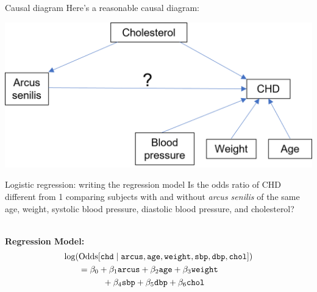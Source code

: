 \documentclass[10pt,t]{beamer}
\newcommand\tab[1][1cm]{\hspace*{#1}}
\begin{document}
\begin{frame}{Causal diagram}
	Here's a reasonable causal diagram:
	\begin{center}
		\includegraphics[width=\textwidth]{./figs/DAG}
		\end{center}
	
\end{frame}

\begin{frame}{Logistic regression: writing the regression model}
	Is the odds ratio of CHD different from 1 comparing subjects with and without \textit{arcus senilis} of the same age, weight, systolic blood pressure, diastolic blood pressure, and cholesterol? 
	\\ ~\ 
	
	\textbf{Regression Model:} \pause
	\begin{align*}
		\log(&\text{Odds}[\texttt{chd} \mid \texttt{arcus}, \texttt{age}, \texttt{weight}, \texttt{sbp}, \texttt{dbp}, \texttt{chol}]) \\
		&= \beta_0 + \beta_1\texttt{arcus} + \beta_2\texttt{age} + \beta_3\texttt{weight} \\
		&\tab + \beta_4\texttt{sbp} + \beta_5\texttt{dbp} + \beta_6\texttt{chol}
	\end{align*}
\end{frame}
\end{document}

